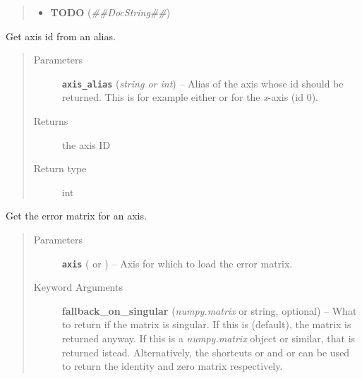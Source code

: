 \documentclass[a4paper,10pt,english]{sphinxmanual}
\begin{document}
\begin{fulllineitems}
\begin{fulllineitems}
\begin{quote}
\begin{description}
\begin{itemize}
\item {} 
\textbf{TODO} (\emph{\#\#DocString\#\#})

\end{itemize}


\end{description}\end{quote}

\end{fulllineitems}


\begin{fulllineitems}
\label{index:kafe.dataset.Dataset.get_axis}
Get axis id from an alias.
\begin{quote}\begin{description}
\item[{Parameters}] \leavevmode
\textbf{\texttt{axis\_alias}} (\emph{string or int}) -- Alias of the axis whose id should be returned. This is for example
either  or  for the \emph{x}-axis (id 0).

\item[{Returns}] \leavevmode
the axis ID

\item[{Return type}] \leavevmode
int

\end{description}\end{quote}

\end{fulllineitems}


\begin{fulllineitems}
\label{index:kafe.dataset.Dataset.get_cov_mat}
Get the error matrix for an axis.
\begin{quote}\begin{description}
\item[{Parameters}] \leavevmode
\textbf{\texttt{axis}} ( or ) -- Axis for which to load the error matrix.

\item[{Keyword Arguments}] \leavevmode
\textbf{fallback\_on\_singular} (\emph{numpy.matrix} or string, optional) --
What to return if the matrix is singular. If this is 
(default), the matrix is returned anyway. If this is a
\emph{numpy.matrix} object or similar, that is returned istead.
Alternatively, the shortcuts  or  and 
or  can be used to return the identity and zero matrix
respectively.


\end{description}
\end{quote}
\end{fulllineitems}
\end{fulllineitems}
\end{document}
